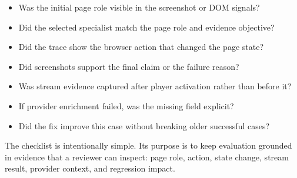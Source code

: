 \begin{itemize}
  \item Was the initial page role visible in the screenshot or DOM signals?
  \item Did the selected specialist match the page role and evidence objective?
  \item Did the trace show the browser action that changed the page state?
  \item Did screenshots support the final claim or the failure reason?
  \item Was stream evidence captured after player activation rather than before
  it?
  \item If provider enrichment failed, was the missing field explicit?
  \item Did the fix improve this case without breaking older successful cases?
\end{itemize}

The checklist is intentionally simple. Its purpose is to keep evaluation
grounded in evidence that a reviewer can inspect: page role, action, state
change, stream result, provider context, and regression impact.
